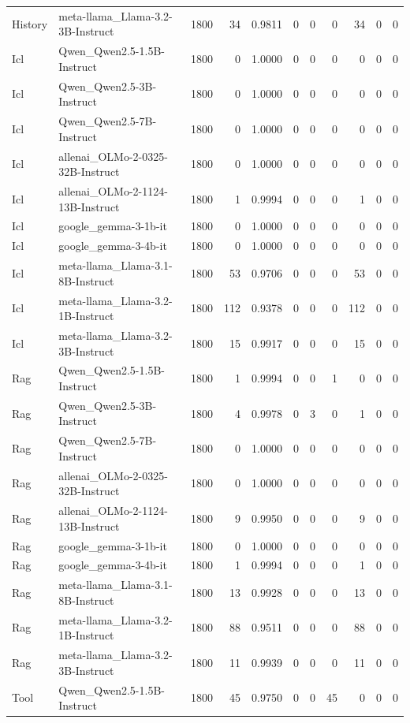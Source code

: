 \begin{tabular}{llrrrrrrrrr}
History & meta-llama_Llama-3.2-3B-Instruct & 1800 & 34 & 0.9811 & 0 & 0 & 0 & 34 & 0 & 0 \\
Icl & Qwen_Qwen2.5-1.5B-Instruct & 1800 & 0 & 1.0000 & 0 & 0 & 0 & 0 & 0 & 0 \\
Icl & Qwen_Qwen2.5-3B-Instruct & 1800 & 0 & 1.0000 & 0 & 0 & 0 & 0 & 0 & 0 \\
Icl & Qwen_Qwen2.5-7B-Instruct & 1800 & 0 & 1.0000 & 0 & 0 & 0 & 0 & 0 & 0 \\
Icl & allenai_OLMo-2-0325-32B-Instruct & 1800 & 0 & 1.0000 & 0 & 0 & 0 & 0 & 0 & 0 \\
Icl & allenai_OLMo-2-1124-13B-Instruct & 1800 & 1 & 0.9994 & 0 & 0 & 0 & 1 & 0 & 0 \\
Icl & google_gemma-3-1b-it & 1800 & 0 & 1.0000 & 0 & 0 & 0 & 0 & 0 & 0 \\
Icl & google_gemma-3-4b-it & 1800 & 0 & 1.0000 & 0 & 0 & 0 & 0 & 0 & 0 \\
Icl & meta-llama_Llama-3.1-8B-Instruct & 1800 & 53 & 0.9706 & 0 & 0 & 0 & 53 & 0 & 0 \\
Icl & meta-llama_Llama-3.2-1B-Instruct & 1800 & 112 & 0.9378 & 0 & 0 & 0 & 112 & 0 & 0 \\
Icl & meta-llama_Llama-3.2-3B-Instruct & 1800 & 15 & 0.9917 & 0 & 0 & 0 & 15 & 0 & 0 \\
Rag & Qwen_Qwen2.5-1.5B-Instruct & 1800 & 1 & 0.9994 & 0 & 0 & 1 & 0 & 0 & 0 \\
Rag & Qwen_Qwen2.5-3B-Instruct & 1800 & 4 & 0.9978 & 0 & 3 & 0 & 1 & 0 & 0 \\
Rag & Qwen_Qwen2.5-7B-Instruct & 1800 & 0 & 1.0000 & 0 & 0 & 0 & 0 & 0 & 0 \\
Rag & allenai_OLMo-2-0325-32B-Instruct & 1800 & 0 & 1.0000 & 0 & 0 & 0 & 0 & 0 & 0 \\
Rag & allenai_OLMo-2-1124-13B-Instruct & 1800 & 9 & 0.9950 & 0 & 0 & 0 & 9 & 0 & 0 \\
Rag & google_gemma-3-1b-it & 1800 & 0 & 1.0000 & 0 & 0 & 0 & 0 & 0 & 0 \\
Rag & google_gemma-3-4b-it & 1800 & 1 & 0.9994 & 0 & 0 & 0 & 1 & 0 & 0 \\
Rag & meta-llama_Llama-3.1-8B-Instruct & 1800 & 13 & 0.9928 & 0 & 0 & 0 & 13 & 0 & 0 \\
Rag & meta-llama_Llama-3.2-1B-Instruct & 1800 & 88 & 0.9511 & 0 & 0 & 0 & 88 & 0 & 0 \\
Rag & meta-llama_Llama-3.2-3B-Instruct & 1800 & 11 & 0.9939 & 0 & 0 & 0 & 11 & 0 & 0 \\
Tool & Qwen_Qwen2.5-1.5B-Instruct & 1800 & 45 & 0.9750 & 0 & 0 & 45 & 0 & 0 & 0 \\

\end{tabular}
